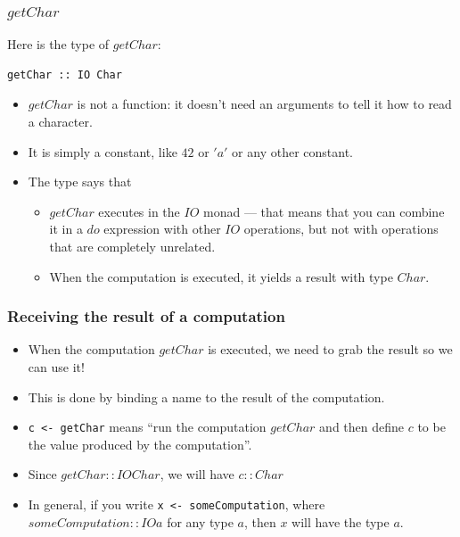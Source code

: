 \documentclass{beamer}
\begin{document}
\begin{frame}[fragile]
\frametitle{$getChar$}

Here is the type of $getChar$:

\begin{verbatim}
getChar :: IO Char
\end{verbatim}

\begin{itemize}
\item $getChar$ is not a function: it doesn't need an arguments to
  tell it how to read a character.
\item It is simply a constant, like $42$ or $'a'$ or any other
  constant.
\item The type says that
  \begin{itemize}
  \item $getChar$ executes in the $IO$ monad --- that means that
    you can combine it in a $do$ expression with other $IO$
    operations, but not with operations that are completely
    unrelated.
  \item When the computation is executed, it yields a result with
    type $Char$.
  \end{itemize}
\end{itemize}
\end{frame}

\begin{frame}[fragile]
\frametitle{Receiving the result of a computation}

\begin{itemize}
\item When the computation $getChar$ is executed, we need to grab
  the result so we can use it!
\item This is done by binding a name to the result of the computation.
\item {\tt c <- getChar} means ``run the computation $getChar$ and then
  define $c$ to be the value produced by the computation''.
\item Since $getChar :: IO Char$, we will have $c :: Char$
\item In general, if you write {\tt x <- someComputation}, where
  $someComputation :: IO a$ for any type $a$, then $x$ will have
  the type $a$.
\end{itemize}

\end{frame}
\end{document}
